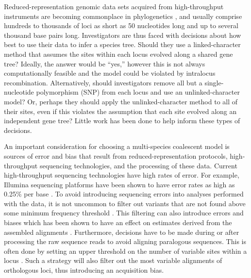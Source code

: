 Reduced-representation genomic data sets acquired from high-throughput
instruments are becoming commonplace in phylogenetics \citep{Leache2017}, and
usually comprise hundreds to thousands of loci as short as 50 nucleotides long
and up to several thousand base pairs long.
Investigators are thus faced with decisions about how best to 
use their data to infer a species tree.
Should they use a linked-character method that assumes the sites within each
locus evolved along a shared gene tree?
Ideally, the answer would be ``yes,'' however this is not always
computationally feasible and the model could be violated by intralocus
recombination.
Alternatively, should investigators remove all but a single-nucleotide
polymorphism (SNP) from each locus and use an unlinked-character model?
Or, perhaps they should apply the unlinked-character method to all of their
sites, even if this violates the assumption that each site evolved along an
independent gene tree?
Little work has been done to help inform these types of decisions. 

An important consideration for choosing a multi-species coalescent model is
sources of error and bias that result from reduced-representation protocols,
high-throughput sequencing technologies, and the processing of these data.
Current high-throughput sequencing technologies have high rates of error.
For example, Illumina sequencing platforms have been shown to have error rates
as high as 0.25\% per base 
\citep{@pfeifferSystematicEvaluationError2018}. 
To avoid introducing sequencing errors into analyses performed with the data, it is not 
uncommon to filter out variants that are not found above some minimum frequency 
threshold \citep{rochetteStacksAnalyticalMethods2019, linckMinorAlleleFrequency2019}. 
This filtering can also introduce errors and biases which has been 
shown to have an effect on estimates derived from the assembled alignments
\citep{Harvey2015,linckMinorAlleleFrequency2019}.
Furthermore, decisions have to be made during or after processing
the raw sequence reads to avoid aligning paralogous sequences.
This is often done by setting an upper threshold on the number of variable
sites within a locus \citationNeeded.
Such a strategy will also filter out the most variable alignments
of orthologous loci, thus introducing an acquisition bias.


